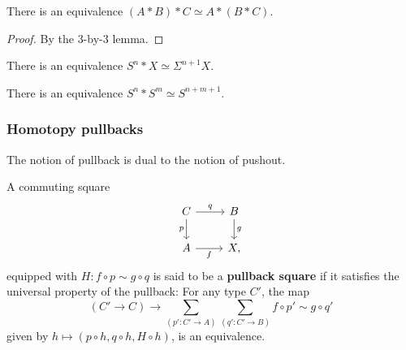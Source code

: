 \documentclass[handout]{beamer}
\newcommand{\sphere}[1]{S^{#1}}
\begin{document}
\begin{frame}
  \begin{theorem}
    There is an equivalence $(A\ast B)\ast C\simeq A\ast(B\ast C)$. 
  \end{theorem}

  \begin{proof}
    By the 3-by-3 lemma.
  \end{proof}
  
  \begin{corollary}
    There is an equivalence $\sphere{n}\ast X\simeq \Sigma^{n+1}X$.
  \end{corollary}
  \begin{corollary}
    There is an equivalence $\sphere{n}\ast\sphere{m}\simeq \sphere{n+m+1}$. 
  \end{corollary}
\end{frame}

\begin{frame}
  \frametitle{Homotopy pullbacks}
  The notion of pullback is dual to the notion of pushout.
  \begin{definition}
    A commuting square
  \begin{equation*}
    \begin{tikzcd}[ampersand replacement=\&]
      C \arrow[d,swap,"p"] \arrow[r,"q"] \& B \arrow[d,"g"] \\
      A \arrow[r,swap,"f"] \& X,
    \end{tikzcd}
  \end{equation*}
  equipped with $H:f\circ p\sim g\circ q$ is said to be a \textbf{pullback square} if it satisfies the universal property of the pullback: For any type $C'$, the map
  \begin{equation*}
    (C'\to C)\to \sum_{(p':C'\to A)}\sum_{(q':C'\to B)}f\circ p'\sim g\circ q'
  \end{equation*}
  given by $h\mapsto (p\circ h,q\circ h,H\circ h)$, is an equivalence.
  \end{definition}
\end{frame}
\end{document}
